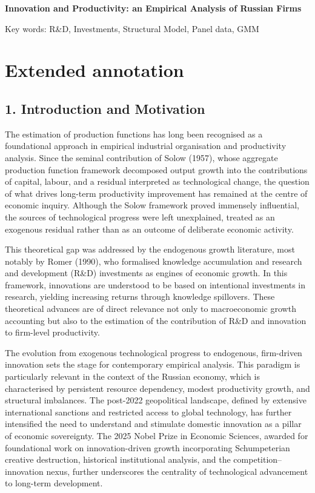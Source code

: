 \documentclass[a4paper, 12pt]{article}
\begin{document}
\begin{center}
\textbf{Innovation and Productivity: an Empirical Analysis of Russian Firms}
\end{center}

Key words: R\&D, Investments, Structural Model, Panel data, GMM

\section{Extended annotation}

\subsection{1. Introduction and Motivation}

The estimation of production functions has long been recognised as a foundational approach in empirical industrial organisation and productivity analysis. Since the seminal contribution of Solow (1957), whose aggregate production function framework decomposed output growth into the contributions of capital, labour, and a residual interpreted as technological change, the question of what drives long-term productivity improvement has remained at the centre of economic inquiry. Although the Solow framework proved immensely influential, the sources of technological progress were left unexplained, treated as an exogenous residual rather than as an outcome of deliberate economic activity.

This theoretical gap was addressed by the endogenous growth literature, most notably by Romer (1990), who formalised knowledge accumulation and research and development (R\&D) investments as engines of economic growth. In this framework, innovations are understood to be based on intentional investments in research, yielding increasing returns through knowledge spillovers. These theoretical advances are of direct relevance not only to macroeconomic growth accounting but also to the estimation of the contribution of R\&D and innovation to firm-level productivity.

The evolution from exogenous technological progress to endogenous, firm-driven innovation sets the stage for contemporary empirical analysis. This paradigm is particularly relevant in the context of the Russian economy, which is characterised by persistent resource dependency, modest productivity growth, and structural imbalances. The post-2022 geopolitical landscape, defined by extensive international sanctions and restricted access to global technology, has further intensified the need to understand and stimulate domestic innovation as a pillar of economic sovereignty. The 2025 Nobel Prize in Economic Sciences, awarded for foundational work on innovation-driven growth incorporating Schumpeterian creative destruction, historical institutional analysis, and the competition–innovation nexus, further underscores the centrality of technological advancement to long-term development.
\end{document}
